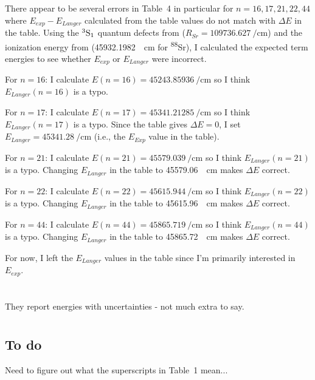 \documentclass{article}
\newcommand{\tsup}{\textsuperscript}													%
\newcommand{\tsub}{\textsubscript}														%
\newcommand{\Sr}[1]{\tsup{#1}\textnormal{Sr}}											%
\newcommand{\SLJ}[3]{\tsup{#1}\textnormal{#2}\tsub{#3}}
\begin{document}
There appear to be several errors in Table~4 in particular for ${n=16, 17, 21, 22, 44}$ where ${E_{exp} - E_{Langer}}$ calculated from the table values do not match with ${\Delta E}$ in the table. Using the $\SLJ{3}{S}{1}$ quantum defects from \cite{vjp_2012} (${R_{Sr} = \SI{109736.627}{\per\cm}}$) and the ionization energy from \cite{san_2010} (\SI{45932.1982}{\per\cm} for \Sr{88}), I calculated the expected term energies to see whether $E_{exp}$ or $E_{Langer}$ were incorrect. 

For ${n=16}$: I calculate ${E(n=16) = \SI{45243.85936}{\per\cm}}$ so I think ${E_{Langer}(n=16)}$ is a typo.

For ${n=17}$: I calculate ${E(n=17) = \SI{45341.21285}{\per\cm}}$ so I think ${E_{Langer}(n=17)}$ is a typo. Since the table gives ${\Delta E = 0}$, I set ${E_{Langer} = \SI{45341.28}{\per\cm}}$ (i.e., the $E_{Exp}$ value in the table).

For ${n=21}$: I calculate ${E(n=21) = \SI{45579.039}{\per\cm}}$ so I think ${E_{Langer}(n=21)}$ is a typo. Changing $E_{Langer}$ in the table to \SI{45579.06}{\per\cm} makes ${\Delta E}$ correct.

For ${n=22}$: I calculate ${E(n=22) = \SI{45615.944}{\per\cm}}$ so I think ${E_{Langer}(n=22)}$ is a typo. Changing $E_{Langer}$ in the table to \SI{45615.96}{\per\cm} makes ${\Delta E}$ correct.

For ${n=44}$: I calculate ${E(n=44) = \SI{45865.719}{\per\cm}}$ so I think ${E_{Langer}(n=44)}$ is a typo. Changing $E_{Langer}$ in the table to \SI{45865.72}{\per\cm} makes ${\Delta E}$ correct.

For now, I left the $E_{Langer}$ values in the table since I'm primarily interested in $E_{exp}$.

\section{}

They report energies with uncertainties - not much extra to say.

\section{}

\subsection{To do}

Need to figure out what the superscripts in Table~1 mean...
\end{document}
